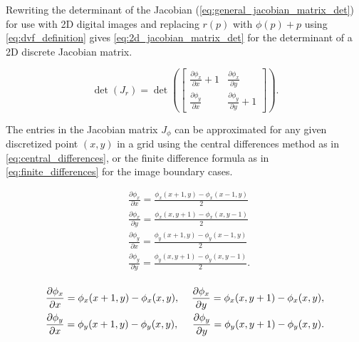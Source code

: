 Rewriting the determinant of the Jacobian (\autoref{eq:general_jacobian_matrix_det}) for use with 2D digital images and replacing $r(p)$ with $\phi(p)+p$ using \autoref{eq:dvf_definition} gives \autoref{eq:2d_jacobian_matrix_det} for the determinant of a 2D discrete Jacobian matrix.

\begin{equation} \label{eq:2d_jacobian_matrix_det}
    \det(J_{r}) = 
    \det\left( 
    \begin{bmatrix}
    \frac{\partial \phi_x}{\partial x} + 1 & \frac{\partial \phi_x}{\partial y} \\
    \frac{\partial \phi_y}{\partial x} & \frac{\partial \phi_y}{\partial y} + 1
    \end{bmatrix}
    \right).
\end{equation}

The entries in the Jacobian matrix $J_{\phi}$ can be approximated for any given discretized point $(x, y)$ in a grid using the central differences method as in \autoref{eq:central_differences}, or the finite difference formula as in \autoref{eq:finite_differences} for the image boundary cases.

\begin{equation} \label{eq:central_differences}
    \begin{aligned}
        & \frac{\partial \phi_x}{\partial x} = \frac{\phi_x(x + 1, y) - \phi_x(x - 1, y)}{2} \\
        & \frac{\partial \phi_x}{\partial y} = \frac{\phi_x(x, y + 1) - \phi_x(x, y - 1)}{2} \\
        & \frac{\partial \phi_y}{\partial x} = \frac{\phi_y(x + 1, y) - \phi_y(x - 1, y)}{2} \\
        & \frac{\partial \phi_y}{\partial y} = \frac{\phi_y(x, y + 1) - \phi_y(x, y - 1)}{2}. \\
    \end{aligned}
\end{equation}

\begin{equation} \label{eq:finite_differences}
    \begin{aligned}
        & \frac{\partial \phi_x}{\partial x} = \phi_x(x + 1, y) - \phi_x(x, y), \hspace{0.05in}
        & \frac{\partial \phi_x}{\partial y} = \phi_x(x, y + 1) - \phi_x(x, y), \\
        & \frac{\partial \phi_y}{\partial x} = \phi_y(x + 1, y) - \phi_y(x, y), \hspace{0.05in}
        & \frac{\partial \phi_y}{\partial y} = \phi_y(x, y + 1) - \phi_y(x, y). \\
    \end{aligned}
\end{equation}

